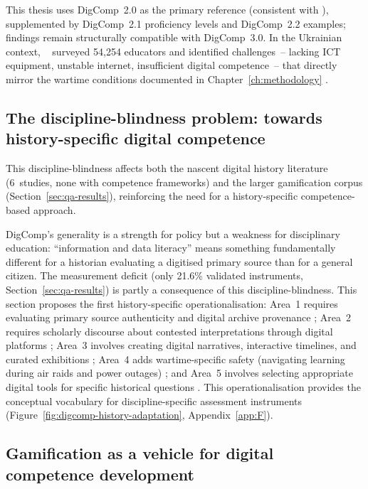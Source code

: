 This thesis uses DigComp~2.0 as the primary reference (consistent with \cite{Titova2025cte}), supplemented by DigComp~2.1 proficiency levels and DigComp~2.2 examples; findings remain structurally compatible with DigComp~3.0. In the Ukrainian context, \citeauthor{Ovcharuk2023}~\cite{Ovcharuk2023} surveyed 54,254 educators and identified challenges~-- lacking ICT equipment, unstable internet, insufficient digital competence~-- that directly mirror the wartime conditions documented in Chapter~\ref{ch:methodology} \citep{UNESCO2023}.

\subsection{The discipline-blindness problem: towards history-specific digital competence}

This discipline-blindness affects both the nascent digital history literature (6~studies, none with competence frameworks) and the larger gamification corpus (Section~\ref{sec:qa-results}), reinforcing the need for a history-specific competence-based approach.

DigComp's generality is a strength for policy but a weakness for disciplinary education: ``information and data literacy'' means something fundamentally different for a historian evaluating a digitised primary source than for a general citizen. The measurement deficit (only 21.6\% validated instruments, Section~\ref{sec:qa-results}) is partly a consequence of this discipline-blindness. This section proposes the first history-specific operationalisation: Area~1 requires evaluating primary source authenticity and digital archive provenance \citep{Crymble2021, ROMEIN}; Area~2 requires scholarly discourse about contested interpretations through digital platforms \citep{Graham20151}; Area~3 involves creating digital narratives, interactive timelines, and curated exhibitions \citep{Crymble2021, MonteSano2012}; Area~4 adds wartime-specific safety (navigating learning during air raids and power outages) \citep{UNESCO2023, Ovcharuk2023}; and Area~5 involves selecting appropriate digital tools for specific historical questions \citep{Graham20151, Reisman2012}. This operationalisation provides the conceptual vocabulary for discipline-specific assessment instruments (Figure~\ref{fig:digcomp-history-adaptation}, Appendix~\ref{app:F}).

\subsection{Gamification as a vehicle for digital competence development}

